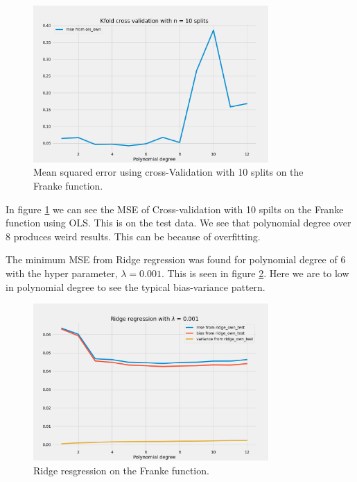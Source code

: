 \begin{figure}[H]
    \centering
    \includegraphics[width=0.8\textwidth]{Figures/d_kfold_ols_n_10.png}
    \caption{Mean squared error using cross-Validation with 10 splits on the Franke function.}
    \label{fig:kfold_ols_franke}
\end{figure}

In figure \ref{fig:kfold_ols_franke} we can see the MSE of Cross-validation with 10 spilts on the Franke function using OLS. This is on the test data. We see that polynomial degree over 8 produces weird results. This can be because of overfitting. 


The minimum MSE from Ridge regression was found for polynomial degree of 6 with
the hyper parameter, $\lambda = 0.001$. This is seen in figure \ref{fig:ridge_blabla}. Here we are to low in polynomial degree to see the typical bias-variance pattern.

\begin{figure}[H]
    \centering
    \caption{Ridge resgression on the Franke function.}
    \label{fig:ridge_blabla}
    \includegraphics[width=0.8\textwidth]{Figures/e_ridge_bias_variance_lamb_0_001.png}
\end{figure}


